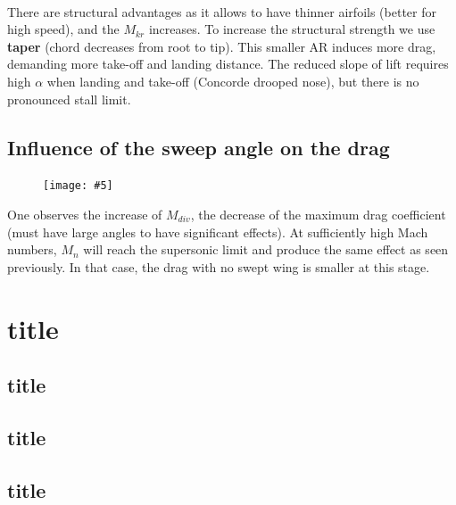 \documentclass[british,french,11pt, a4paper, openany]{article}
\newcommand{\wrapfig}[6]{%
	\begin{figure}%
		\vspace{-5mm}%
		\texttt{[image: \#5]}%
		\captionof{figure}{}%
		\label{#6}%
	\end{figure}%
}
\begin{document}
\ \\ There are structural advantages as it allows to have thinner airfoils (better for high speed), and the $M_{kr}$ increases. To increase the structural strength we use \textbf{taper} (chord decreases from root to tip). This smaller AR induces more drag, demanding more take-off and landing distance. The reduced slope of lift requires high $\alpha$ when landing and take-off (Concorde drooped nose), but there is no pronounced stall limit.    

\subsection{Influence of the sweep angle on the drag}	
\wrapfig{7}{l}{6}{0.1}{ch7/7}{ch7/7}
One observes the increase of $M_{div}$, the decrease of the maximum drag coefficient (must have large angles to have significant effects). At sufficiently high Mach numbers, $M_n$ will reach the supersonic limit and produce the same effect as seen previously. In that case, the drag with no swept wing is smaller at this stage. 




\section{title}
\subsection{title}
\subsection{title}
\subsection{title}
\end{document}
